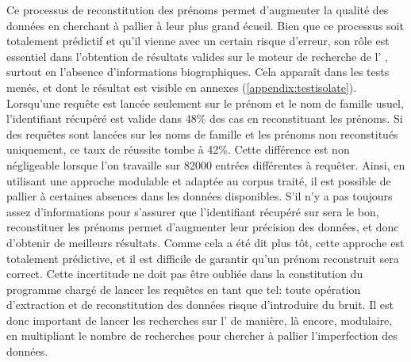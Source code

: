 Ce processus de reconstitution des prénoms permet d'augmenter la qualité des données en cherchant à pallier à leur plus grand écueil. Bien que ce processus soit totalement prédictif et qu'il vienne avec un certain risque d'erreur, son rôle est essentiel dans l'obtention de résultats valides sur le moteur de recherche de l'\api{} \wkd{}, surtout en l'absence d'informations biographiques. Cela apparaît dans les tests menés, et dont le résultat est visible en annexes (\ref{appendix:testisolate}). Lorsqu'une requête est lancée seulement sur le prénom et le nom de famille usuel, l'identifiant \wkd{} récupéré est valide dans 48\% des cas en reconstituant les prénoms. Si des requêtes sont lancées sur les noms de famille et les prénoms non reconstitués uniquement, ce taux de réussite tombe à 42\%. Cette différence est non négligeable lorsque l'on travaille sur 82000 entrées différentes à requêter. Ainsi, en utilisant une approche modulable et adaptée au corpus traité, il est possible de pallier à certaines absences dans les données disponibles. S'il n'y a pas toujours assez d'informations pour s'assurer que l'identifiant récupéré sur \wkd{} sera le bon, reconstituer les prénoms permet d'augmenter leur précision des données, et donc d'obtenir de meilleurs résultats. Comme cela a été dit plus tôt, cette approche est totalement prédictive, et il est difficile de garantir qu'un prénom reconstruit sera correct. Cette incertitude ne doit pas être oubliée dans la constitution du programme chargé de lancer les requêtes en tant que tel: toute opération d'extraction et de reconstitution des données risque d'introduire du bruit. Il est donc important de lancer les recherches sur l'\api{} de manière, là encore, modulaire, en multipliant le nombre de recherches pour chercher à pallier l'imperfection des données.

